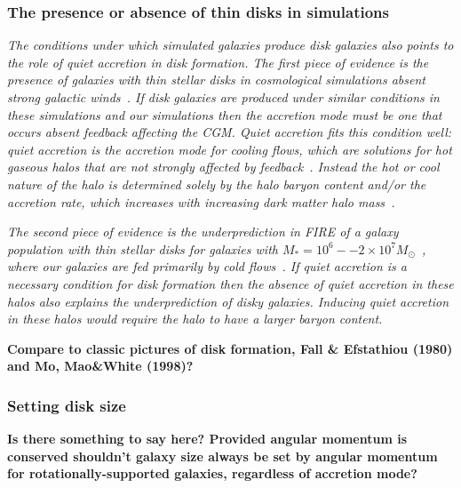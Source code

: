 \documentclass[fleqn,usenatbib]{mnras}
\begin{document}
\subsubsection{The presence or absence of thin disks in simulations}
\label{s: discussion -- disk formation -- population}

\textit{
The conditions under which simulated galaxies produce disk galaxies also points to the role of quiet accretion in disk formation.
The first piece of evidence is the presence of galaxies with thin stellar disks in cosmological simulations absent strong galactic winds~\citep{Guedes2011, Bird2013}.
If disk galaxies are produced under similar conditions in these simulations and our simulations then the accretion mode must be one that occurs absent feedback affecting the CGM.
Quiet accretion fits this condition well:
quiet accretion is the accretion mode for cooling flows, which are solutions for hot gaseous halos that are \textit{not} strongly affected by feedback~\citep{Stern2019}.
Instead the hot or cool nature of the halo is determined solely by the halo baryon content and/or the accretion rate, which increases with increasing dark matter halo mass~\citep{Stern2020a}.
}

\textit{
The second piece of evidence is the underprediction in FIRE of a galaxy population with thin stellar disks for galaxies with $M_* = 10^6 -- 2 \times 10^7 M_\odot$~\citep{El-Badry2018a}, where our galaxies are fed primarily by cold flows~\citep{Stern2020}.
If quiet accretion is a necessary condition for disk formation then the absence of quiet accretion in these halos also explains the underprediction of disky galaxies.
Inducing quiet accretion in these halos would require the halo to have a larger baryon content.
}

\textbf{
Compare to classic pictures of disk formation, Fall \& Efstathiou (1980) and Mo, Mao\&White (1998)?
}

\subsubsection{Setting disk size}

\textbf{
Is there something to say here?
Provided angular momentum is conserved shouldn't galaxy size always be set by angular momentum for rotationally-supported galaxies, regardless of accretion mode?
}

\end{document}

